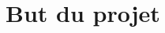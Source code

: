 \documentclass[../introduction.tex]{subfiles}
\begin{document}
\section{But du projet}
\end{document}

